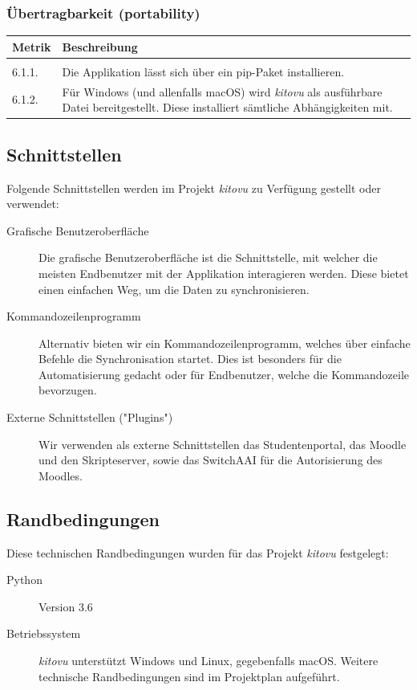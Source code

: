 \documentclass[a4paper]{article}
\begin{document}
\subsubsection{Übertragbarkeit (portability)}

\begin{tabulary}{\linewidth}{lL}
  \toprule
  Metrik & Beschreibung \\
  \midrule
   \\
  6.1.1. & Die Applikation lässt sich über ein pip-Paket\footnotemark{} installieren. \\
  6.1.2. & Für Windows (und allenfalls macOS) wird \emph{kitovu} als ausführbare Datei bereitgestellt. Diese installiert sämtliche Abhängigkeiten mit. \\
  \bottomrule
\end{tabulary}

\subsection{Schnittstellen}

Folgende Schnittstellen werden im Projekt \emph{kitovu} zu Verfügung gestellt oder verwendet:

\begin{description}
  \item[Grafische Benutzeroberfläche]
    Die grafische Benutzeroberfläche ist die Schnittstelle, mit welcher die meisten Endbenutzer mit der Applikation interagieren werden.
    Diese bietet einen einfachen Weg, um die Daten zu synchronisieren.
  \item[Kommandozeilenprogramm]
    Alternativ bieten wir ein Kommandozeilenprogramm, welches über einfache Befehle die Synchronisation startet.
    Dies ist besonders für die Automatisierung gedacht oder für Endbenutzer, welche die Kommandozeile bevorzugen.
  \item[Externe Schnittstellen ("Plugins")]
    Wir verwenden als externe Schnittstellen das Studentenportal, das Moodle und den Skripteserver, sowie das SwitchAAI für die Autorisierung des Moodles.
\end{description}

\subsection{Randbedingungen}

Diese technischen Randbedingungen wurden für das Projekt \emph{kitovu} festgelegt:

\begin{description}
  \item[Python] Version 3.6
  \item[Betriebssystem] \emph{kitovu} unterstützt Windows und Linux, gegebenfalls macOS. Weitere technische Randbedingungen sind im Projektplan aufgeführt.
\end{description}
\end{document}
